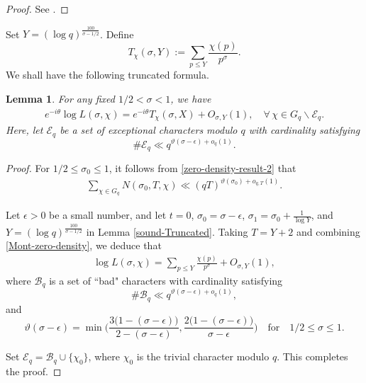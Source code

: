 \documentclass[12pt]{amsart}
\numberwithin{equation}{section}
\theoremstyle{plain}
\newtheorem{lem}{Lemma}
\theoremstyle{remark}
\theoremstyle{definition}
\theoremstyle{remark}
\begin{document}
\begin{proof}
See \cite[Lemma 8.2]{Granville2001}.
\end{proof}

Set $Y=(\log q)^{\frac{100}{\sigma-1/2}}$. Define
\[
T_{\chi}(\sigma,Y):=\sum_{p\leq Y}\frac{\chi(p)}{p^{\sigma}}.
\]
We shall have the following truncated formula.
\begin{lem}\label{truncated-log-Dirichlet}
For any fixed $1/2<\sigma<1$, we have
\begin{equation*}
\begin{aligned}
e^{-i\theta}\log L(\sigma,\chi)=e^{-i\theta}T_{\chi}(\sigma,X)+O_{\sigma,Y}(1),\quad\forall\,\chi\in G_q\backslash \mathcal{E}_{q}.
\end{aligned}
\end{equation*}
Here, let $\mathcal{E}_{q}$ be a set of exceptional characters modulo $q$ with cardinality satisfying
\[
\#\mathcal{E}_{q}\ll q^{\vartheta(\sigma-\epsilon)+o_q(1)}.
\]
\end{lem}


\begin{proof}
For $1/2\leq\sigma_0\leq1$, it follows from \eqref{zero-density-result-2} that
\begin{equation}\label{Mont-zero-density}
\begin{aligned}
\sum_{\chi\in G_q}N(\sigma_0,T,\chi)\ll (qT)^{\vartheta(\sigma_0)+o_{q,T}(1)}.
\end{aligned}
\end{equation}


Let $\epsilon>0$ be a small number, and let $t=0$, $\sigma_0=\sigma-\epsilon$, $\sigma_1=\sigma_0+\frac{1}{\log Y}$, and $Y=(\log q)^{\frac{100}{\sigma-1/2}}$ in Lemma \ref{sound-Truncated}. Taking $T=Y+2$ and combining \eqref{Mont-zero-density}, we deduce that
\begin{equation*}
\begin{aligned}
\log L(\sigma,\chi)=\sum_{p\leq Y}\frac{\chi(p)}{p^{\sigma}}+O_{\sigma,Y}(1),
\end{aligned}
\end{equation*}
where $\mathcal{B}_{q}$ is a set of ``bad" characters with cardinality satisfying
\[
\#\mathcal{B}_{q}\ll q^{\vartheta(\sigma-\epsilon)+o_q(1)},
\]
and
\[
\vartheta(\sigma-\epsilon)=\min\bigg(\frac{3\big(1-(\sigma-\epsilon)\big)}{2-(\sigma-\epsilon)},\frac{2\big(1-(\sigma-\epsilon)\big)}{\sigma-\epsilon}\bigg)
\quad\text{for}\quad 1/2\leq\sigma\leq1.
\]

Set $\mathcal{E}_{q}=\mathcal{B}_{q}\cup\{\chi_0\}$, where $\chi_0$ is the trivial character modulo $q$. This completes the proof.
\end{proof}
\end{document}
